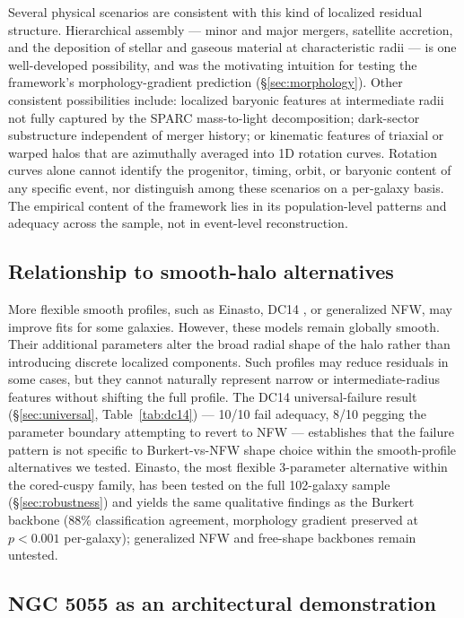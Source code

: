 Several physical scenarios are consistent with this kind of localized residual structure. Hierarchical assembly --- minor and major mergers, satellite accretion, and the deposition of stellar and gaseous material at characteristic radii --- is one well-developed possibility, and was the motivating intuition for testing the framework's morphology-gradient prediction (\S\ref{sec:morphology}). Other consistent possibilities include: localized baryonic features at intermediate radii not fully captured by the SPARC mass-to-light decomposition; dark-sector substructure independent of merger history; or kinematic features of triaxial or warped halos that are azimuthally averaged into 1D rotation curves. Rotation curves alone cannot identify the progenitor, timing, orbit, or baryonic content of any specific event, nor distinguish among these scenarios on a per-galaxy basis. The empirical content of the framework lies in its population-level patterns and adequacy across the sample, not in event-level reconstruction.

\subsection{Relationship to smooth-halo alternatives}

More flexible smooth profiles, such as Einasto, DC14 \citep{DiCintio2014a,DiCintio2014b}, or generalized NFW, may improve fits for some galaxies. However, these models remain globally smooth. Their additional parameters alter the broad radial shape of the halo rather than introducing discrete localized components. Such profiles may reduce residuals in some cases, but they cannot naturally represent narrow or intermediate-radius features without shifting the full profile. The DC14 universal-failure result (\S\ref{sec:universal}, Table~\ref{tab:dc14}) --- 10/10 fail adequacy, 8/10 pegging the parameter boundary attempting to revert to NFW --- establishes that the failure pattern is not specific to Burkert-vs-NFW shape choice within the smooth-profile alternatives we tested. Einasto, the most flexible 3-parameter alternative within the cored-cuspy family, has been tested on the full 102-galaxy sample (\S\ref{sec:robustness}) and yields the same qualitative findings as the Burkert backbone (88\% classification agreement, morphology gradient preserved at $p < 0.001$ per-galaxy); generalized NFW and free-shape backbones remain untested.

\subsection{NGC 5055 as an architectural demonstration}

